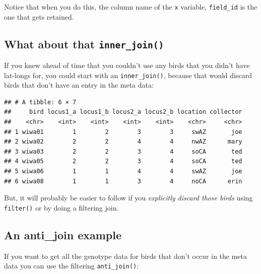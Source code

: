 \documentclass[]{book}
\newenvironment{Shaded}{\begin{snugshade}}{\end{snugshade}}
\newcommand{\KeywordTok}[1]{\textcolor[rgb]{0.13,0.29,0.53}{\textbf{{#1}}}}
\newcommand{\DataTypeTok}[1]{\textcolor[rgb]{0.13,0.29,0.53}{{#1}}}
\newcommand{\StringTok}[1]{\textcolor[rgb]{0.31,0.60,0.02}{{#1}}}
\newcommand{\NormalTok}[1]{{#1}}
\theoremstyle{definition}
\theoremstyle{definition}
\theoremstyle{remark}
\begin{document}
Notice that when you do this, the column name of the \texttt{x}
variable, \texttt{field\_id} is the one that gets retained.

\subsection{\texorpdfstring{What about that
\texttt{inner\_join()}}{What about that inner\_join()}}\label{what-about-that-inner_join}

If you knew ahead of time that you couldn't use any birds that you
didn't have lat-longs for, you could start with an
\texttt{inner\_join()}, because that would discard birds that don't have
an entry in the meta data:

\begin{Shaded}
\end{Shaded}

\begin{verbatim}
## # A tibble: 6 × 7
##     bird locus1_a locus1_b locus2_a locus2_b location collector
##    <chr>    <int>    <int>    <int>    <int>    <chr>     <chr>
## 1 wiwa01        1        2        3        3     swAZ       joe
## 2 wiwa02        2        2        4        4     nwAZ      mary
## 3 wiwa03        2        2        3        4     soCA       ted
## 4 wiwa05        2        2        3        4     soCA       ted
## 5 wiwa06        1        1        4        4     swAZ       joe
## 6 wiwa08        1        1        3        4     noCA      erin
\end{verbatim}

But, it will probably be easier to follow if you \emph{explicitly
discard those birds} using \texttt{filter()} or by doing a filtering
join.

\subsection{An anti\_join example}\label{an-anti_join-example}

If you want to get all the genotype data for birds that don't occur in
the meta data you can use the filtering \texttt{anti\_join()}:

\begin{Shaded}
\end{Shaded}
\end{document}
